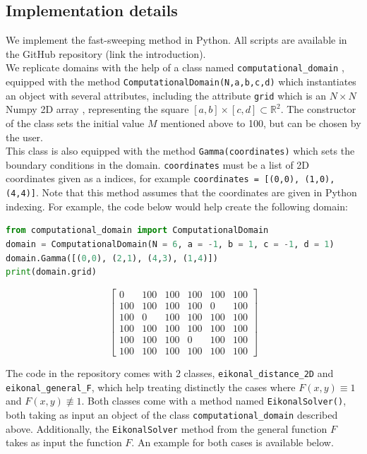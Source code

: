 \documentclass[11pt]{article}
\theoremstyle{definition}
\theoremstyle{remark}
\newcommand{\R}{\mathbb{R}}
\begin{document}
\subsection{Implementation details}
We implement the fast-sweeping method in Python. All scripts are available in the GitHub repository (link the introduction). \\
We replicate domains with the help of a class named \texttt{computational\_domain}
, equipped with the method \texttt{ComputationalDomain(N,a,b,c,d)} which instantiates an object with several attributes, including the attribute \texttt{grid} which is an $N\times N$ Numpy 2D array \cite{numpy}, representing the square $[a,b]\times[c,d]\subset\R^2$. The constructor of the class sets the initial value $M$ mentioned above to 100, but can be chosen by the user.\\
This class is also equipped with the method \texttt{Gamma(coordinates)} which sets the boundary conditions in the domain. \texttt{coordinates} must be a list of 2D coordinates given as a indices, for example \texttt{coordinates = [(0,0), (1,0), (4,4)]}. Note that this method assumes that the coordinates are given in Python indexing. For example, the code below would help create the following domain: \\
\begin{lstlisting}[language=Python, caption=Instance of computational domain, label=lst:fsweep]
from computational_domain import ComputationalDomain
domain = ComputationalDomain(N = 6, a = -1, b = 1, c = -1, d = 1)
domain.Gamma([(0,0), (2,1), (4,3), (1,4)])
print(domain.grid)
\end{lstlisting} 

\[
\begin{bmatrix}
0 & 100 & 100 & 100 & 100 & 100 \\
100 & 100 & 100 & 100 & 0 & 100 \\
100 & 0 & 100 & 100 & 100 & 100 \\
100 & 100 & 100 & 100 & 100 & 100 \\
100 & 100 & 100 & 0 & 100 & 100 \\
100 & 100 & 100 & 100 & 100 & 100
\end{bmatrix}
\]


\noindent The code in the repository comes with 2 classes, \texttt{eikonal\_distance\_2D} and \texttt{eikonal\_general\_F}, which help treating distinctly the cases where $F(x,y)\equiv1$ and $F(x,y)\not\equiv1$. Both classes come with a method named \texttt{EikonalSolver()}, both taking as input an object of the class \texttt{computational\_domain} described above. Additionally, the \texttt{EikonalSolver} method from the general function $F$ takes as input the function $F$. An example for both cases is available below. \\
\end{document}
